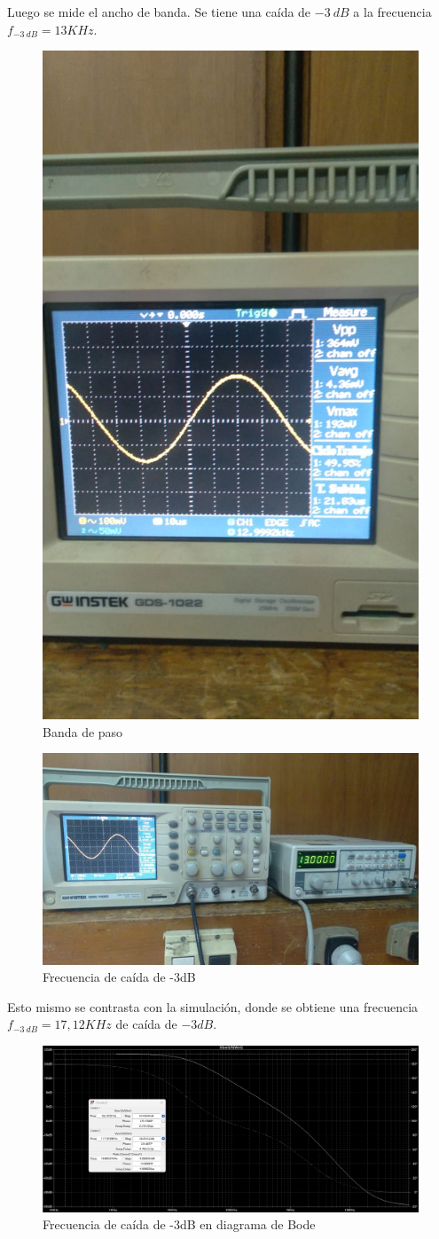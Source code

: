 Luego se mide el ancho de banda. Se tiene una caída de \(-3~dB\) a la frecuencia \(f_{-3~dB}= 13KHz\).
\begin{figure}[h!]
    \centering
    \includegraphics[width=0.7\linewidth]{img/Banda de paso.jpeg}
    \caption{Banda de paso}   
\end{figure}

\newpage

\begin{figure}[h!]
    \centering
    \includegraphics[width=0.8\linewidth]{img/Ancho de banda.jpeg}
    \caption{Frecuencia de caída de -3dB}
\end{figure}

Esto mismo se contrasta con la simulación, donde se obtiene una frecuencia \(f_{-3~dB}= 17,12KHz\) de caída de \(-3dB\).

\begin{figure}[h!]
    \centering
    \includegraphics[width=0.8\linewidth]{img/Lab2_Bode_3dB.png}
    \caption{Frecuencia de caída de -3dB en diagrama de Bode}
\end{figure}
